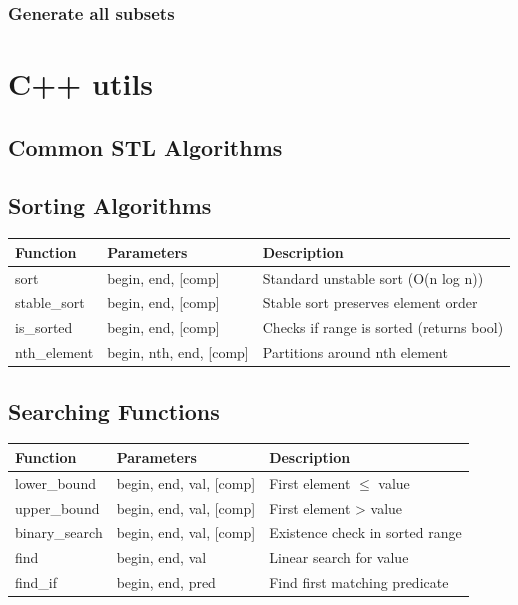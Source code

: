 \documentclass[10pt,letterpaper,landscape,twocolumn]{article}
\begin{document}


\subsubsection{Generate all subsets}


\section{C++ utils}

\subsection{Common STL Algorithms}

\subsection*{Sorting Algorithms}
\begin{tabularx}{\linewidth}{|l|l|X|}
    \hline
    \textbf{Function} & \textbf{Parameters} & \textbf{Description} \\
    \hline
    sort & begin, end, [comp] & Standard unstable sort (O(n log n)) \\
    \hline
    stable\_sort & begin, end, [comp] & Stable sort preserves element order \\
    \hline
    is\_sorted & begin, end, [comp] & Checks if range is sorted (returns bool) \\
    \hline
    nth\_element & begin, nth, end, [comp] & Partitions around nth element \\
    \hline
\end{tabularx}

\subsection*{Searching Functions}
\begin{tabularx}{\linewidth}{|l|l|X|}
    \hline
    \textbf{Function} & \textbf{Parameters} & \textbf{Description} \\
    \hline
    lower\_bound & begin, end, val, [comp] & First element $\leq$ value \\
    \hline
    upper\_bound & begin, end, val, [comp] & First element > value \\
    \hline
    binary\_search & begin, end, val, [comp] & Existence check in sorted range \\
    \hline
    find & begin, end, val & Linear search for value \\
    \hline
    find\_if & begin, end, pred & Find first matching predicate \\
    \hline
\end{tabularx}
\end{document}
